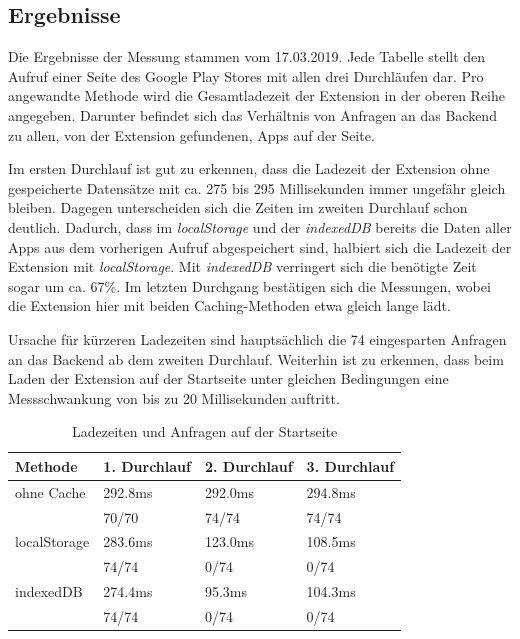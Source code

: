 \subsection{Ergebnisse}
\label{ss:ergebnisseht2}

Die Ergebnisse der Messung stammen vom 17.03.2019. Jede Tabelle stellt den Aufruf einer Seite des Google Play Stores mit allen drei Durchläufen dar. Pro angewandte Methode wird die Gesamtladezeit der Extension in der oberen Reihe angegeben. Darunter befindet sich das Verhältnis von Anfragen an das Backend zu allen, von der Extension gefundenen, Apps auf der Seite.

Im ersten Durchlauf ist gut zu erkennen, dass die Ladezeit der Extension ohne gespeicherte Datensätze mit ca. 275 bis 295 Millisekunden immer ungefähr gleich bleiben. Dagegen unterscheiden sich die Zeiten im zweiten Durchlauf schon deutlich. Dadurch, dass im \textit{localStorage} und der \textit{indexedDB} bereits die Daten aller Apps aus dem vorherigen Aufruf abgespeichert sind, halbiert sich die Ladezeit der Extension mit \textit{localStorage}. Mit \textit{indexedDB} verringert sich die benötigte Zeit sogar um ca. 67\%. Im letzten Durchgang bestätigen sich die Messungen, wobei die Extension hier mit beiden Caching-Methoden etwa gleich lange lädt. 

Ursache für kürzeren Ladezeiten sind hauptsächlich die 74 eingesparten Anfragen an das Backend ab dem zweiten Durchlauf. Weiterhin ist zu erkennen, dass beim Laden der Extension auf der Startseite unter gleichen Bedingungen eine Messschwankung von bis zu 20 Millisekunden auftritt.

\begin{table}[h]
	\begin{tabular}{p{2.8cm}C{3.0cm}C{2.8cm}C{3.0cm}}
		\toprule
		\textbf{Methode}	&	\textbf{1. Durchlauf}	&	\textbf{2. Durchlauf}	& \textbf{3. Durchlauf}\\
			\midrule
			ohne Cache	&	292.8ms	&	292.0ms	&	294.8ms	\\
						&	70/70	&	74/74	&	74/74	\\

			localStorage	&	283.6ms	&	123.0ms	&	108.5ms	\\
						&	74/74	&	0/74	&	0/74	\\

			indexedDB	&	274.4ms	&	95.3ms	&	104.3ms	\\
						&	74/74	&	0/74	&	0/74	\\

			\bottomrule
		\end{tabular}
		\caption{Ladezeiten und Anfragen auf der Startseite}
		\label{ergebnis11}
\end{table}

